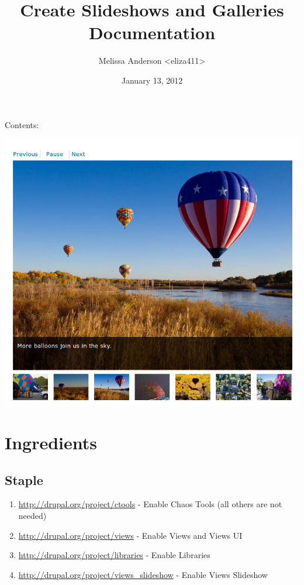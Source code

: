 \documentclass[letterpaper,10pt,english]{sphinxmanual}
\title{Create Slideshows and Galleries Documentation}
\date{January 13, 2012}
\author{Melissa Anderson \textless{}eliza411\textgreater{}}
\begin{document}
\maketitle
\tableofcontents
{}\label{index::doc}


Contents:

\includegraphics{balloons.png}


\chapter{Ingredients}
\label{slideshows::doc}\label{slideshows:welcome-to-create-slideshows-and-galleries-s-documentation}\label{slideshows:ingredients}

\section{Staple}
\label{slideshows:staple}\begin{enumerate}
\item {} 
\href{http://drupal.org/project/ctools}{http://drupal.org/project/ctools} - Enable Chaos Tools (all others are not needed)

\item {} 
\href{http://drupal.org/project/views}{http://drupal.org/project/views} - Enable Views and Views UI

\item {} 
\href{http://drupal.org/project/libraries}{http://drupal.org/project/libraries} - Enable Libraries

\item {} 
\href{http://drupal.org/project/views\_slideshow}{http://drupal.org/project/views\_slideshow} - Enable Views Slideshow

\end{enumerate}
\end{document}

